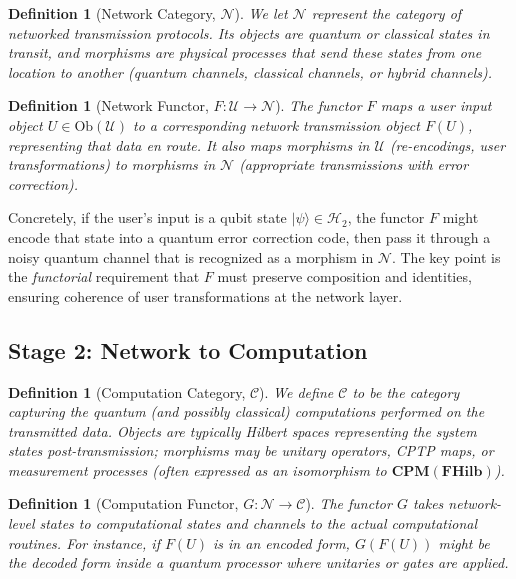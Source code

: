 \documentclass[12pt]{article}
\newtheorem{definition}[theorem]{Definition}
\begin{document}
\begin{definition}[Network Category, $\mathcal{N}$]
We let $\mathcal{N}$ represent the category of networked transmission protocols. Its objects are quantum or classical states \emph{in transit}, and morphisms are physical processes that send these states from one location to another (quantum channels, classical channels, or hybrid channels).
\end{definition}

\begin{definition}[Network Functor, $F: \mathcal{U} \to \mathcal{N}$]
The functor $F$ maps a user input object $U \in \mathrm{Ob}(\mathcal{U})$ to a corresponding network transmission object $F(U)$, representing that data en route. It also maps morphisms in $\mathcal{U}$ (re-encodings, user transformations) to morphisms in $\mathcal{N}$ (appropriate transmissions with error correction).
\end{definition}

Concretely, if the user’s input is a qubit state $\vert \psi \rangle \in \mathcal{H}_2$, the functor $F$ might encode that state into a quantum error correction code, then pass it through a noisy quantum channel that is recognized as a morphism in $\mathcal{N}$. The key point is the \textit{functorial} requirement that $F$ must preserve composition and identities, ensuring coherence of user transformations at the network layer.

\subsection{Stage 2: Network to Computation}

\begin{definition}[Computation Category, $\mathcal{C}$]
We define $\mathcal{C}$ to be the category capturing the quantum (and possibly classical) computations performed on the transmitted data. Objects are typically Hilbert spaces representing the system states post-transmission; morphisms may be unitary operators, CPTP maps, or measurement processes (often expressed as an isomorphism to $\mathbf{CPM}(\mathbf{FHilb})$).
\end{definition}

\begin{definition}[Computation Functor, $G: \mathcal{N} \to \mathcal{C}$]
The functor $G$ takes network-level states to computational states and channels to the actual computational routines. For instance, if $F(U)$ is in an encoded form, $G(F(U))$ might be the decoded form inside a quantum processor where unitaries or gates are applied.
\end{definition}
\end{document}
